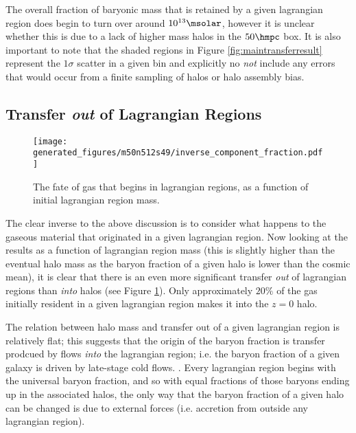 The overall fraction of baryonic mass that is retained by a given lagrangian
region does begin to turn over around $10^{13} \msolar$, however it is unclear
whether this is due to a lack of higher mass halos in the $50 \hmpc$ box. It
is also important to note that the shaded regions in Figure
\ref{fig:maintransferresult} represent the $1\sigma$ scatter in a given bin
and explicitly no \emph{not} include any errors that would occur from a finite
sampling of halos or halo assembly bias.

\subsection{Transfer \emph{out} of Lagrangian Regions}

\begin{figure}
	\centering
	\texttt{[image: generated\_figures/m50n512s49/inverse\_component\_fraction.pdf]}
	\caption{The fate of gas that begins in lagrangian regions, as a function of
	initial lagrangian region mass.  }
	\label{fig:transferoutoflrs}
\end{figure}

The clear inverse to the above discussion is to consider what happens to the gaseous
material that originated in a given lagrangian region. Now looking at the results as
a function of lagrangian region mass (this is slightly higher than the eventual
halo mass as the baryon fraction of a given halo is lower than the cosmic mean), it
is clear that there is an even more significant transfer \emph{out} of lagrangian
regions than \emph{into} halos (see Figure \ref{fig:transferoutoflrs}). Only 
approximately $20\%$ of the gas initially resident in a given lagrangian region
makes it into the $z=0$ halo.

The relation between halo mass and transfer out of a given lagrangian region is
relatively flat; this suggests that the origin of the baryon fraction is transfer
prodcued by flows \emph{into} the lagrangian region; i.e. the baryon fraction of
a given galaxy is driven by late-stage cold flows. . Every lagrangian region
begins with the universal baryon fraction, and so with equal fractions of those
baryons ending up in the associated halos, the only way that the baryon fraction
of a given halo can be changed is due to external forces (i.e. accretion from
outside any lagrangian region).

